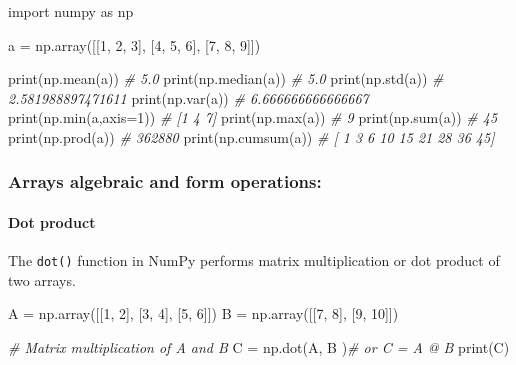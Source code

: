 \documentclass[11pt]{article}
\newenvironment{Shaded}{}{}
\newcommand{\DecValTok}[1]{\textcolor[rgb]{0.25,0.63,0.44}{{#1}}}
\newcommand{\CommentTok}[1]{\textcolor[rgb]{0.38,0.63,0.69}{\textit{{#1}}}}
\newcommand{\NormalTok}[1]{{#1}}
\newcommand{\ImportTok}[1]{{#1}}
\newcommand{\OperatorTok}[1]{\textcolor[rgb]{0.40,0.40,0.40}{{#1}}}
\newcommand{\BuiltInTok}[1]{{#1}}
\begin{document}
\begin{Shaded}
\begin{Highlighting}[]
\ImportTok{import}\NormalTok{ numpy }\ImportTok{as}\NormalTok{ np}

\NormalTok{a }\OperatorTok{=}\NormalTok{ np.array([[}\DecValTok{1}\NormalTok{, }\DecValTok{2}\NormalTok{, }\DecValTok{3}\NormalTok{], [}\DecValTok{4}\NormalTok{, }\DecValTok{5}\NormalTok{, }\DecValTok{6}\NormalTok{], [}\DecValTok{7}\NormalTok{, }\DecValTok{8}\NormalTok{, }\DecValTok{9}\NormalTok{]])}

\BuiltInTok{print}\NormalTok{(np.mean(a))          }\CommentTok{\# 5.0}
\BuiltInTok{print}\NormalTok{(np.median(a))        }\CommentTok{\# 5.0}
\BuiltInTok{print}\NormalTok{(np.std(a))           }\CommentTok{\# 2.581988897471611}
\BuiltInTok{print}\NormalTok{(np.var(a))           }\CommentTok{\# 6.666666666666667}
\BuiltInTok{print}\NormalTok{(np.}\BuiltInTok{min}\NormalTok{(a,axis}\OperatorTok{=}\DecValTok{1}\NormalTok{))     }\CommentTok{\# [1 4 7]}
\BuiltInTok{print}\NormalTok{(np.}\BuiltInTok{max}\NormalTok{(a))           }\CommentTok{\# 9}
\BuiltInTok{print}\NormalTok{(np.}\BuiltInTok{sum}\NormalTok{(a))           }\CommentTok{\# 45}
\BuiltInTok{print}\NormalTok{(np.prod(a))          }\CommentTok{\# 362880}
\BuiltInTok{print}\NormalTok{(np.cumsum(a))        }\CommentTok{\# [ 1  3  6 10 15 21 28 36 45]}
\end{Highlighting}
\end{Shaded}

\hypertarget{arrays-algebraic-and-form-operations}{%
\subsubsection{Arrays algebraic and form
operations:}\label{arrays-algebraic-and-form-operations}}

\hypertarget{dot-product}{%
\paragraph{Dot product}\label{dot-product}}

The \texttt{dot()} function in NumPy performs matrix multiplication or
dot product of two arrays.

\begin{Shaded}
\begin{Highlighting}[]
\NormalTok{A }\OperatorTok{=}\NormalTok{ np.array([[}\DecValTok{1}\NormalTok{, }\DecValTok{2}\NormalTok{], [}\DecValTok{3}\NormalTok{, }\DecValTok{4}\NormalTok{], [}\DecValTok{5}\NormalTok{, }\DecValTok{6}\NormalTok{]])}
\NormalTok{B }\OperatorTok{=}\NormalTok{ np.array([[}\DecValTok{7}\NormalTok{, }\DecValTok{8}\NormalTok{], [}\DecValTok{9}\NormalTok{, }\DecValTok{10}\NormalTok{]])}

\CommentTok{\# Matrix multiplication of A and B}
\NormalTok{C }\OperatorTok{=}\NormalTok{ np.dot(A, B )}\CommentTok{\# or C = A @ B}
\BuiltInTok{print}\NormalTok{(C)}
\end{Highlighting}
\end{Shaded}
\end{document}
